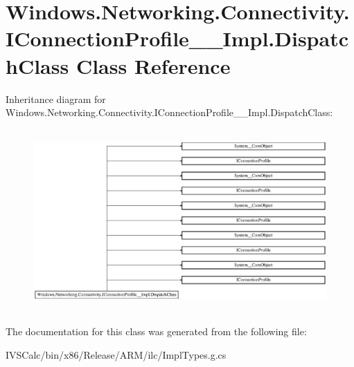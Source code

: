 \hypertarget{class_windows_1_1_networking_1_1_connectivity_1_1_i_connection_profile_____impl_1_1_dispatch_class}{}\section{Windows.\+Networking.\+Connectivity.\+I\+Connection\+Profile\+\_\+\+\_\+\+Impl.\+Dispatch\+Class Class Reference}
\label{class_windows_1_1_networking_1_1_connectivity_1_1_i_connection_profile_____impl_1_1_dispatch_class}
Inheritance diagram for Windows.\+Networking.\+Connectivity.\+I\+Connection\+Profile\+\_\+\+\_\+\+Impl.\+Dispatch\+Class\+:\begin{figure}[H]
\begin{center}
\leavevmode
\includegraphics[height=7.015945cm]{class_windows_1_1_networking_1_1_connectivity_1_1_i_connection_profile_____impl_1_1_dispatch_class}
\end{center}
\end{figure}


The documentation for this class was generated from the following file\+:\begin{DoxyCompactItemize}
\item 
I\+V\+S\+Calc/bin/x86/\+Release/\+A\+R\+M/ilc/Impl\+Types.\+g.\+cs\end{DoxyCompactItemize}
